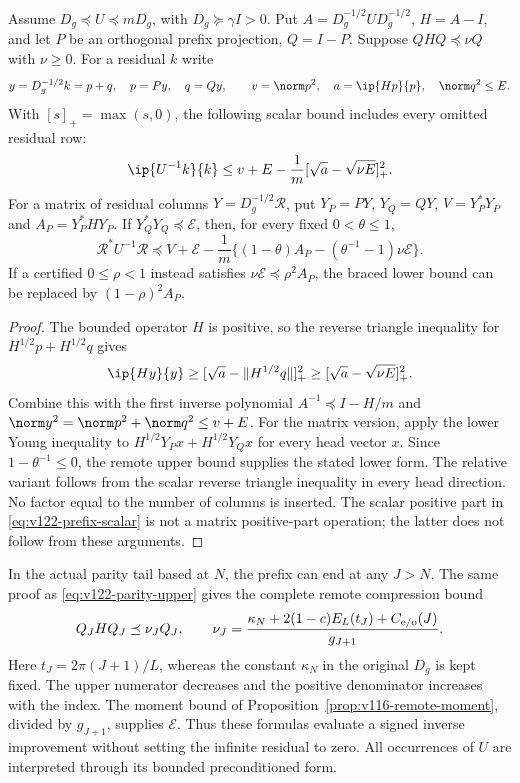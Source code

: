 \begin{proposition}
\label{prop:v122-prefix-refinement}
Assume $D_g\preceq U\preceq mD_g$, with
$D_g\succeq\gamma I>0$. Put
$A=D_g^{-1/2}UD_g^{-1/2}$, $H=A-I$, and let $P$ be an
orthogonal prefix projection, $Q=I-P$. Suppose
$QHQ\preceq\nu Q$ with $\nu\ge0$. For a residual $k$ write
\[
 y=D_g^{-1/2}k=p+q,\quad p=Py,\quad q=Qy,\qquad
 v=\norm p^2,\quad a=\ip{Hp}{p},\quad \norm q^2\le E.
\]
With $[s]_+=\max(s,0)$, the following scalar bound includes
every omitted residual row:
\begin{equation}\label{eq:v122-prefix-scalar}
 \ip{U^{-1}k}{k}
 \le v+E-\frac1m[\sqrt a-\sqrt{\nu E}]_+^2.
\end{equation}
For a matrix of residual columns $Y=D_g^{-1/2}\mathcal R$, put
$Y_P=PY$, $Y_Q=QY$, $V=Y_P^*Y_P$ and
$A_P=Y_P^*HY_P$. If $Y_Q^*Y_Q\preceq\mathcal E$, then, for
every fixed $0<\theta\le1$,
\begin{equation}\label{eq:v122-prefix-matrix}
 \mathcal R^*U^{-1}\mathcal R\preceq
 V+\mathcal E-\frac1m
 \{(1-\theta)A_P-(\theta^{-1}-1)\nu\mathcal E\}.
\end{equation}
If a certified $0\le\rho<1$ instead satisfies
$\nu\mathcal E\preceq\rho^2A_P$, the braced lower bound can
be replaced by $(1-\rho)^2A_P$.
\end{proposition}
\begin{proof}
The bounded operator $H$ is positive, so the reverse triangle
inequality for $H^{1/2}p+H^{1/2}q$ gives
\[
 \ip{Hy}{y}\ge
 [\sqrt a-\|H^{1/2}q\|]_+^2
 \ge[\sqrt a-\sqrt{\nu E}]_+^2.
\]
Combine this with the first inverse polynomial
$A^{-1}\preceq I-H/m$ and
$\norm y^2=\norm p^2+\norm q^2\le v+E$.
For the matrix version, apply the lower Young inequality to
$H^{1/2}Y_Px+H^{1/2}Y_Qx$ for every head vector $x$.
Since $1-\theta^{-1}\le0$, the remote upper bound supplies the
stated lower form. The relative variant follows from the scalar
reverse triangle inequality in every head direction. No factor
equal to the number of columns is inserted. The scalar positive
part in \eqref{eq:v122-prefix-scalar} is not a matrix positive-part
operation; the latter does not follow from these arguments.
\end{proof}

In the actual parity tail based at $N$, the prefix can end at any
$J>N$. The same proof as \eqref{eq:v122-parity-upper} gives the
complete remote compression bound
\begin{equation}\label{eq:v122-remote-H}
 Q_JHQ_J\preceq\nu_J Q_J,\qquad
 \nu_J=\frac{\kappa_N+2(1-c)E_L(t_J)+C_{\rm e/o}(J)}{g_{J+1}}.
\end{equation}
Here $t_J=2\pi(J+1)/L$, whereas the constant $\kappa_N$ in
the original $D_g$ is kept fixed. The upper numerator decreases
and the positive denominator increases with the index. The moment
bound of Proposition~\ref{prop:v116-remote-moment}, divided by
$g_{J+1}$, supplies $\mathcal E$. Thus these formulas evaluate a
signed inverse improvement without setting the infinite residual
to zero. All occurrences of $U$ are interpreted through its
bounded preconditioned form.

